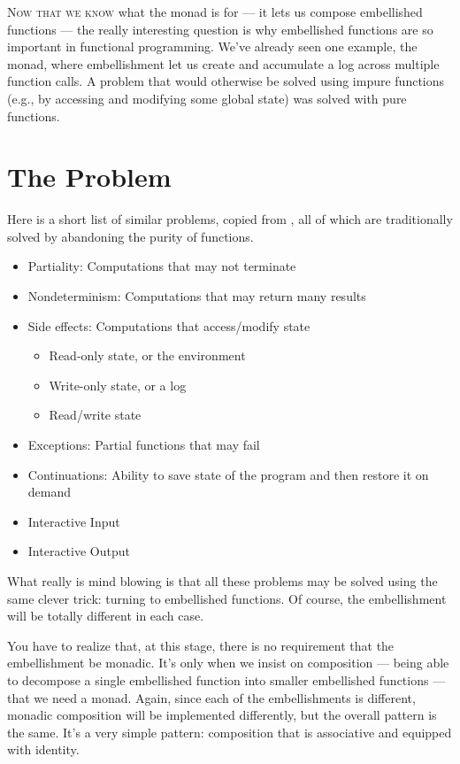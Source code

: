 \lettrine[lhang=0.17]{N}{ow that we know} what the monad is for --- it lets us compose
embellished functions --- the really interesting question is why
embellished functions are so important in functional programming. We've
already seen one example, the  monad, where embellishment
let us create and accumulate a log across multiple function calls. A
problem that would otherwise be solved using impure functions (e.g., by
accessing and modifying some global state) was solved with pure
functions.

\section{The Problem}

Here is a short list of similar problems, copied from
, all of which are traditionally solved by abandoning the
purity of functions.

\begin{itemize}
\tightlist
\item
  Partiality: Computations that may not terminate
\item
  Nondeterminism: Computations that may return many results
\item
  Side effects: Computations that access/modify state

  \begin{itemize}
  \tightlist
  \item
    Read-only state, or the environment
  \item
    Write-only state, or a log
  \item
    Read/write state
  \end{itemize}
\item
  Exceptions: Partial functions that may fail
\item
  Continuations: Ability to save state of the program and then restore
  it on demand
\item
  Interactive Input
\item
  Interactive Output
\end{itemize}

What really is mind blowing is that all these problems may be solved
using the same clever trick: turning to embellished functions. Of
course, the embellishment will be totally different in each case.

You have to realize that, at this stage, there is no requirement that
the embellishment be monadic. It's only when we insist on composition
--- being able to decompose a single embellished function into smaller
embellished functions --- that we need a monad. Again, since each of the
embellishments is different, monadic composition will be implemented
differently, but the overall pattern is the same. It's a very simple
pattern: composition that is associative and equipped with identity.

